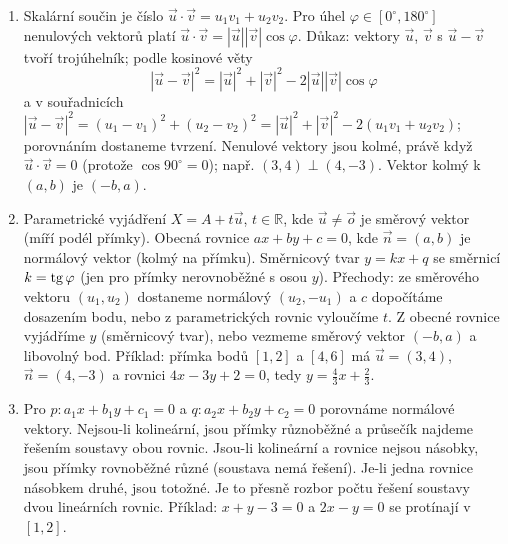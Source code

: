 \begin{enumerate}[label=\textbf{\arabic*.}, leftmargin=*, itemsep=0.8em]
  \item {}
  Skalární součin je číslo $\vec{u}\cdot\vec{v} = u_1v_1 + u_2v_2$. Pro úhel $\varphi\in[0^\circ, 180^\circ]$ nenulových vektorů platí $\vec{u}\cdot\vec{v} = |\vec{u}||\vec{v}|\cos\varphi$. Důkaz: vektory $\vec{u}$, $\vec{v}$ s $\vec{u} - \vec{v}$ tvoří trojúhelník; podle kosinové věty
  \begin{equation*}
    |\vec{u} - \vec{v}|^2 = |\vec{u}|^2 + |\vec{v}|^2 - 2|\vec{u}||\vec{v}|\cos\varphi
  \end{equation*}
  a v souřadnicích $|\vec{u} - \vec{v}|^2 = {(u_1 - v_1)}^2 + {(u_2 - v_2)}^2 = |\vec{u}|^2 + |\vec{v}|^2 - 2(u_1v_1 + u_2v_2)$; porovnáním dostaneme tvrzení. Nenulové vektory jsou kolmé, právě když $\vec{u}\cdot\vec{v} = 0$ (protože $\cos 90^\circ = 0$); např. $(3, 4)\perp(4, -3)$. Vektor kolmý k $(a, b)$ je $(-b, a)$. 

  \item {}
  Parametrické vyjádření $X = A + t\vec{u}$, $t\in\mathbb{R}$, kde $\vec{u}\neq\vec{o}$ je směrový vektor (míří podél přímky). Obecná rovnice $ax + by + c = 0$, kde $\vec{n} = (a, b)$ je normálový vektor (kolmý na přímku). Směrnicový tvar $y = kx + q$ se směrnicí $k = \operatorname{tg}\varphi$ (jen pro přímky nerovnoběžné s osou $y$). Přechody: ze směrového vektoru $(u_1, u_2)$ dostaneme normálový $(u_2, -u_1)$ a $c$ dopočítáme dosazením bodu, nebo z parametrických rovnic vyloučíme $t$. Z obecné rovnice vyjádříme $y$ (směrnicový tvar), nebo vezmeme směrový vektor $(-b, a)$ a libovolný bod. Příklad: přímka bodů $[1, 2]$ a $[4, 6]$ má $\vec{u} = (3, 4)$, $\vec{n} = (4, -3)$ a rovnici $4x - 3y + 2 = 0$, tedy $y = \frac{4}{3}x + \frac{2}{3}$. 

  \item {}
  Pro $p: a_1x + b_1y + c_1 = 0$ a $q: a_2x + b_2y + c_2 = 0$ porovnáme normálové vektory. Nejsou-li kolineární, jsou přímky různoběžné a průsečík najdeme řešením soustavy obou rovnic. Jsou-li kolineární a rovnice nejsou násobky, jsou přímky rovnoběžné různé (soustava nemá řešení). Je-li jedna rovnice násobkem druhé, jsou totožné. Je to přesně rozbor počtu řešení soustavy dvou lineárních rovnic. Příklad: $x + y - 3 = 0$ a $2x - y = 0$ se protínají v $[1, 2]$.


\end{enumerate}
